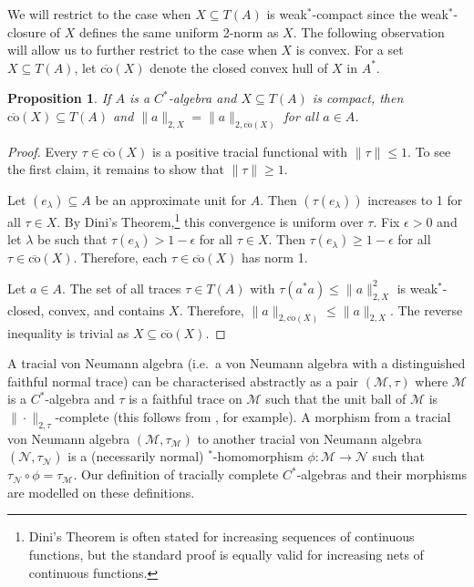\documentclass[a4paper,11pt]{amsart}
\newtheorem{proposition}[theorem]{Proposition}
\theoremstyle{definition}
\numberwithin{equation}{section}
\numberwithin{theorem}{section}
\newcommand{\M}{\mathcal{M}}
\begin{document}
We will restrict to the case when $X \subseteq T(A)$ is weak$^*$-compact since the weak$^*$-closure of $X$ defines the same uniform 2-norm as $X$.  The following observation will allow us to further restrict to the case when $X$ is convex.  For a set $X \subseteq T(A)$, let $\overline{\mathrm{co}}(X)$ denote the closed convex hull of $X$ in $A^*$.

\begin{proposition}\label{prop:co-2-norm}
	If $A$ is a $C^*$-algebra and $X \subseteq T(A)$ is compact, then $\overline{\mathrm{co}}(X) \subseteq T(A)$ and $\|a\|_{2, X} = \|a\|_{2, \overline{\mathrm{co}}(X)}$ for all $a \in A$. 
\end{proposition}

\begin{proof}

Every $\tau \in \overline{\mathrm{co}}(X)$ is a positive tracial functional with $\|\tau\| \leq 1$. To see the first claim, it remains to show that $\|\tau\| \geq 1$.  
	
	Let $(e_\lambda) \subseteq A$ be an approximate unit for $A$. Then $(\tau(e_\lambda))$ increases to 1 for all $\tau \in X$.  By Dini's Theorem,\footnote{Dini's Theorem is often stated for increasing sequences of continuous functions, but the standard proof is equally valid for increasing nets of continuous functions.} this convergence is uniform over $\tau$.  Fix $\epsilon > 0$ and let $\lambda$ be such that $\tau(e_\lambda) > 1 - \epsilon$ for all $\tau \in X$.  Then $\tau(e_\lambda) \geq 1 - \epsilon$ for all $\tau \in \overline{\mathrm{co}}(X)$.  Therefore, each $\tau \in \overline{\mathrm{co}}(X)$ has norm 1.
	
	Let $a \in A$. The set of all traces $\tau \in T(A)$ with $\tau(a^*a) \leq \|a\|_{2,X}^2$ is weak$^*$-closed, convex, and contains $X$. Therefore, $\|a\|_{2, \overline{\mathrm{co}}(X)} \leq \|a\|_{2, X}$. The reverse inequality is trivial as $X \subseteq \overline{\mathrm{co}}(X)$. 
\end{proof}
 
A tracial von Neumann algebra (i.e.\ a von Neumann algebra with a distinguished faithful normal trace) can be characterised abstractly as a pair $(\mathcal M, \tau)$ where $\mathcal M$ is a $C^*$-algebra and $\tau$ is a faithful trace on $\M$ such that the unit ball of $\mathcal M$ is $\|\cdot\|_{2, \tau}$-complete (this follows from \cite[Lemma A.3.3]{Si08}, for example).  A morphism from a tracial von Neumann algebra $(\mathcal M, \tau_\mathcal M)$ to another tracial von Neumann algebra $(\mathcal N, \tau_\mathcal N)$ is a (necessarily normal) $^*$-homomorphism $\phi \colon \mathcal M \rightarrow \mathcal N$ such that $\tau_\mathcal N \circ \phi = \tau_\mathcal M$.  Our definition of tracially complete $C^*$-algebras and their morphisms are modelled on these definitions.
\end{document}
